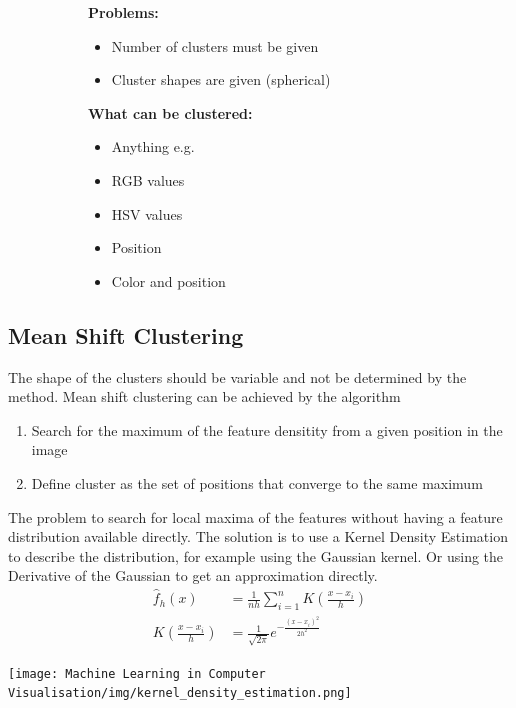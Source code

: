 \documentclass[x11names,11pt,a4paper]{article}
\theoremstyle{definition}
\begin{document}
\begin{figure}[H]
     \centering
     \begin{subfigure}[b]{0.45\textwidth}
        \textbf{Problems:}
        \begin{itemize}
	    \item Number of clusters must be given
	    \item Cluster shapes are given (spherical)
        \end{itemize}
     \end{subfigure}
     \hfill
     \begin{subfigure}[b]{0.45\textwidth}
        \textbf{What can be clustered:}
        \begin{itemize}
	    \item Anything e.g.
         \item RGB values
         \item HSV values
         \item Position
         \item Color and position
        \end{itemize}
     \end{subfigure}
\end{figure}



\subsection{Mean Shift Clustering}
The shape of the clusters should be variable and not be determined by the method. Mean shift clustering can be achieved by the algorithm
\begin{enumerate}
	\item Search for the maximum of the feature densitity from a given position in the image
	\item Define cluster as the set of positions that converge to the same maximum
\end{enumerate}
The problem to search for local maxima of the features without having a feature distribution available directly. The solution is to use a Kernel Density Estimation to describe the distribution, for example using the Gaussian kernel. Or using the Derivative of the Gaussian to get an approximation directly.
\begin{align*}
	\hat{f}_h(x) &= \frac{1}{nh}\sum_{i=1}^{n}K\left(\frac{x-x_i}{h}\right)\\
	K\left(\frac{x-x_i}{h}\right) &= \frac{1}{\sqrt{2\pi}} e^{-\frac{(x-x_i)^2}{2h^2}}
\end{align*}
\begin{center}
	\texttt{[image: Machine Learning in Computer Visualisation/img/kernel\_density\_estimation.png]}
\end{center}
\end{document}

